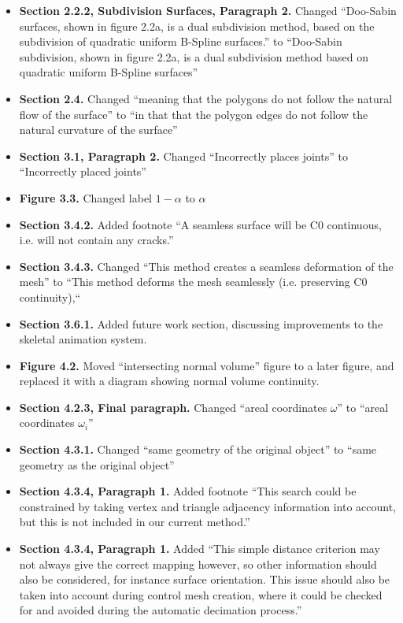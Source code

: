 \documentclass[11pt,a4paper]{book}
\begin{document}
\begin{itemize}
\item{\bf Section 2.2.2, Subdivision Surfaces, Paragraph 2.}
Changed ``Doo-Sabin surfaces, shown in figure 2.2a, is a dual subdivision method, based on the subdivision of quadratic uniform B-Spline surfaces.'' to ``Doo-Sabin subdivision, shown in figure 2.2a, is a dual subdivision method based on quadratic uniform B-Spline surfaces''

\item{\bf Section 2.4.} 
Changed ``meaning that the polygons do not follow the natural flow of the surface'' to ``in that that the polygon edges do not follow the natural curvature of the surface''

\item{\bf Section 3.1, Paragraph 2.}
Changed ``Incorrectly places joints'' to ``Incorrectly placed joints''

\item{\bf Figure 3.3.}
Changed label $1-\alpha$ to $\alpha$

\item{\bf Section 3.4.2.}
Added footnote ``A seamless surface will be C0 continuous, i.e. will not contain any cracks.''

\item{\bf Section 3.4.3.}
Changed ``This method creates a seamless deformation of the mesh'' to ``This method deforms the mesh seamlessly (i.e. preserving C0 continuity),``

\item{\bf Section 3.6.1.}
Added future work section, discussing improvements to the skeletal animation system.

\item{\bf Figure 4.2.}
Moved ``intersecting normal volume'' figure to a later figure, and replaced it with a diagram showing normal volume continuity.

\item{\bf Section 4.2.3, Final paragraph.}
Changed ``areal coordinates $\omega$'' to ``areal coordinates $\omega_i$''

\item{\bf Section 4.3.1.}
Changed ``same geometry of the original object'' to ``same geometry as the original object''

\item{\bf Section 4.3.4, Paragraph 1.}
Added footnote ``This search could be constrained by taking vertex and triangle adjacency information into account, but this is not included in our current method.''

\item{\bf Section 4.3.4, Paragraph 1.}
Added ``This simple distance criterion may not always give the correct mapping however, so other information should also be considered, for instance surface orientation. This issue should also be taken into account during control mesh creation, where it could be checked for and avoided during the automatic decimation process.''


\end{itemize}
\end{document}
